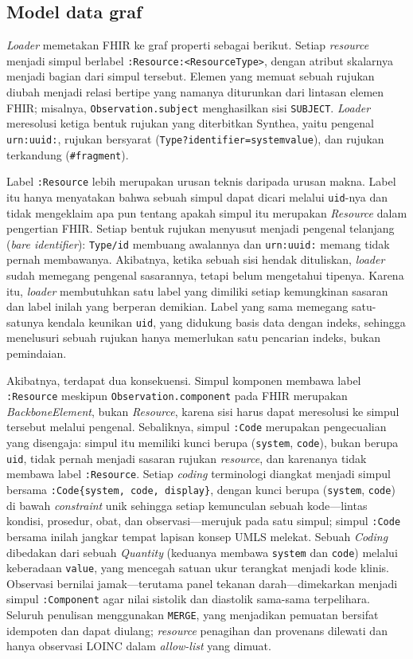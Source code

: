 \subsection{Model data graf}
\emph{Loader} memetakan FHIR ke graf properti sebagai berikut. Setiap \emph{resource} menjadi
simpul berlabel \texttt{:Resource:<ResourceType>}, dengan atribut skalarnya menjadi bagian dari simpul
tersebut. Elemen yang memuat sebuah rujukan diubah menjadi relasi bertipe yang namanya diturunkan dari
lintasan elemen FHIR; misalnya, \texttt{Observation.subject} menghasilkan sisi
\texttt{SUBJECT}. \emph{Loader} meresolusi ketiga bentuk rujukan yang diterbitkan
Synthea, yaitu pengenal \texttt{urn:uuid:}, rujukan bersyarat
(\texttt{Type?identifier=system\textbar value}), dan rujukan terkandung
(\texttt{\#fragment}).

Label \texttt{:Resource} lebih merupakan urusan teknis daripada urusan makna. Label itu hanya
menyatakan bahwa sebuah simpul dapat dicari melalui \texttt{uid}-nya dan tidak mengeklaim apa
pun tentang apakah simpul itu merupakan \emph{Resource} dalam pengertian FHIR. Setiap bentuk rujukan menyusut menjadi pengenal telanjang (\emph{bare identifier}):
\texttt{Type/id} membuang awalannya dan \texttt{urn:uuid:} memang tidak pernah membawanya.
Akibatnya, ketika sebuah sisi hendak dituliskan, \emph{loader} sudah memegang pengenal
sasarannya, tetapi belum mengetahui tipenya. Karena itu, \emph{loader}
membutuhkan satu label yang dimiliki setiap kemungkinan sasaran dan label inilah yang
berperan demikian. Label yang sama memegang satu-satunya kendala keunikan \texttt{uid}, yang
didukung basis data dengan indeks, sehingga menelusuri sebuah rujukan hanya memerlukan
satu pencarian indeks, bukan pemindaian.

Akibatnya, terdapat dua konsekuensi. Simpul komponen membawa label
\texttt{:Resource} meskipun \texttt{Observation.component} pada FHIR merupakan
\emph{BackboneElement}, bukan \emph{Resource}, karena sisi harus dapat meresolusi ke simpul
tersebut melalui pengenal. Sebaliknya, simpul \texttt{:Code} merupakan pengecualian yang
disengaja: simpul itu memiliki kunci berupa (\texttt{system}, \texttt{code}), bukan berupa \texttt{uid},
tidak pernah menjadi sasaran rujukan \emph{resource}, dan karenanya tidak membawa label
\texttt{:Resource}. Setiap \emph{coding} terminologi diangkat menjadi simpul bersama
\texttt{:Code\{system, code, display\}}, dengan kunci berupa (\texttt{system}, \texttt{code}) di
bawah \emph{constraint} unik sehingga setiap kemunculan sebuah kode---lintas kondisi, prosedur,
obat, dan observasi---merujuk pada satu simpul; simpul \texttt{:Code} bersama inilah jangkar
tempat lapisan konsep UMLS melekat. Sebuah \emph{Coding} dibedakan dari sebuah
\emph{Quantity} (keduanya membawa \texttt{system} dan \texttt{code}) melalui keberadaan
\texttt{value}, yang mencegah satuan ukur terangkat menjadi kode klinis. Observasi bernilai
jamak---terutama panel tekanan darah---dimekarkan menjadi simpul \texttt{:Component} agar
nilai sistolik dan diastolik sama-sama terpelihara. Seluruh penulisan menggunakan
\texttt{MERGE}, yang menjadikan pemuatan bersifat idempoten dan dapat diulang;
\emph{resource} penagihan dan provenans dilewati dan hanya observasi LOINC dalam
\emph{allow-list} yang dimuat.


